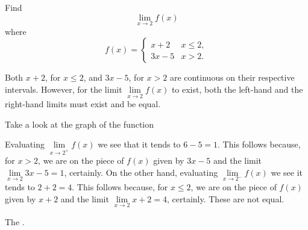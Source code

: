 \documentclass{ximera}
\begin{document}
\begin{question}
  Find 
  \[
  \displaystyle \lim_{x\to 2} f(x)
  \]
  where
  \[
  f(x) = \left\{\begin{array}{cl} x+2 & x\leq 2, \\ 3x-5 & x>2. \end{array}\right.
  \]
  \begin{solution}
    \begin{hint}
     Both $x+2$, for $x\le2$, and $3x-5$, for $x>2$ are continuous on their respective intervals. However, for the limit $\lim\limits_{x\to2}f(x)$ to exist, both the left-hand and the right-hand limits must exist and be equal.
    \end{hint}
     \begin{hint}
    	Take a look at the graph of the function
    \begin{center}
      \end{center} 
    \end{hint}
    \begin{hint}
     Evaluating $\lim\limits_{x\to2^{+}}f(x)$ we see that it tends to $6-5=1$. This follows because, for $x>2$, we are on the piece of $f(x)$ given by $3x-5$ and the limit $\lim\limits_{x\to2}3x-5=1$, certainly. On the other hand, evaluating $\lim\limits_{x\to2^{-}}f(x)$ we see it tends to $2+2=4$. This follows because, for $x\le2$, we are on the piece of $f(x)$ given by $x+2$ and the limit $\lim\limits_{x\to2}x+2=4$, certainly. These are not equal.
    \end{hint}
     The 
    .
  \end{solution}
\end{question}
\end{document}
